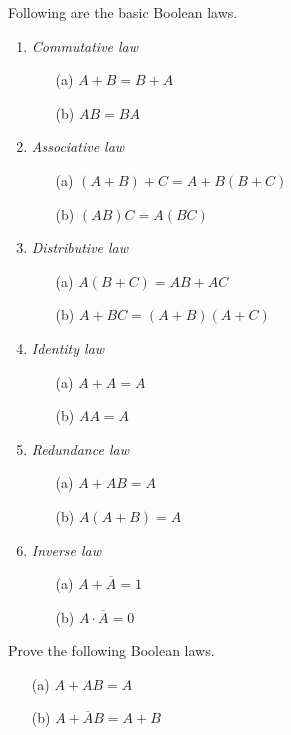 Following are the basic Boolean laws.
\begin{enumerate}
\item {\em Commutative law}
\begin{itemize}
\item[(a)] $A+B=B+A$

\item[(b)] $AB=BA$
\end{itemize}

\item {\em Associative law}
\begin{itemize}
\item[(a)] $(A+B)+C=A+B(B+C)$

\item[(b)] $(AB)C=A(BC)$
\end{itemize}

\item {\em Distributive law}
\begin{itemize}
\item[(a)] $A(B+C)=AB+AC$

\item[(b)] $A+BC=(A+B)(A+C)$
\end{itemize}

\item {\em Identity law}
\begin{itemize}
\item[(a)] $A+A=A$

\item[(b)] $AA=A$
\end{itemize}

\item {\em Redundance law}
\begin{itemize}
\item[(a)] $A+AB=A$

\item[(b)] $A(A+B)=A$
\end{itemize}

\item {\em Inverse law}
\begin{itemize}
\item[(a)] $A+\overline{A}=1$

\item[(b)] $A\cdot \overline{A}=0$
\end{itemize}
\end{enumerate}

\smallskip
\begin{example}\label{exam6.24}
Prove the following Boolean laws.
\begin{itemize}
\item[(a)] $A+AB=A$

\item[(b)] $A+\overline{A}B=A+B$
\end{itemize}
\end{example}

